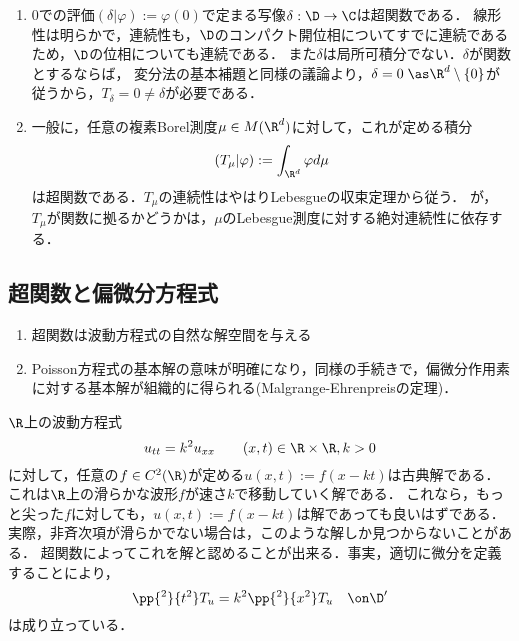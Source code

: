 \documentclass[uplatex,dvipdfmx]{jsreport}
\begin{document}
\begin{example}[測度は超関数である]\mbox{}
    \begin{enumerate}
        \item $0$での評価$(\delta|\varphi):=\varphi(0)$で定まる写像$\delta:\D\to\C$は超関数である．
        線形性は明らかで，連続性も，$\D$のコンパクト開位相についてすでに連続であるため，$\D$の位相についても連続である．
        また$\delta$は局所可積分でない．$\delta$が関数とするならば，
        変分法の基本補題と同様の議論より，$\delta=0\;\as\R^d\setminus\{0\}$が従うから，$T_\delta=0\ne\delta$が必要である．
        \item 一般に，任意の複素Borel測度$\mu\in M(\R^d)$に対して，これが定める積分
        \[(T_\mu|\varphi):=\int_{\R^d}\varphi d\mu\]
        は超関数である．$T_\mu$の連続性はやはりLebesgueの収束定理から従う．
        が，$T_\mu$が関数に拠るかどうかは，$\mu$のLebesgue測度に対する絶対連続性に依存する．
    \end{enumerate}
\end{example}

\subsection{超関数と偏微分方程式}

\begin{tcolorbox}[colframe=ForestGreen, colback=ForestGreen!10!white,breakable,colbacktitle=ForestGreen!40!white,coltitle=black,fonttitle=\bfseries\sffamily,
title=]
    \begin{enumerate}
        \item 超関数は波動方程式の自然な解空間を与える
        \item Poisson方程式の基本解の意味が明確になり，同様の手続きで，偏微分作用素に対する基本解が組織的に得られる(Malgrange-Ehrenpreisの定理)．
    \end{enumerate}
\end{tcolorbox}

\begin{example}[超関数は波動方程式の自然な解空間を与える]
    $\R$上の波動方程式
    \[u_{tt}=k^2u_{xx}\qquad(x,t)\in\R\times\R,k>0\]
    に対して，任意の$f\in C^2(\R)$が定める$u(x,t):=f(x-kt)$は古典解である．
    これは$\R$上の滑らかな波形$f$が速さ$k$で移動していく解である．
    これなら，もっと尖った$f$に対しても，$u(x,t):=f(x-kt)$は解であっても良いはずである．
    実際，非斉次項が滑らかでない場合は，このような解しか見つからないことがある．
    超関数によってこれを解と認めることが出来る．事実，適切に微分を定義することにより，
    \[\pp{^2}{t^2}T_u=k^2\pp{^2}{x^2}T_u\quad\on\D'\]
    は成り立っている．
\end{example}
\end{document}
